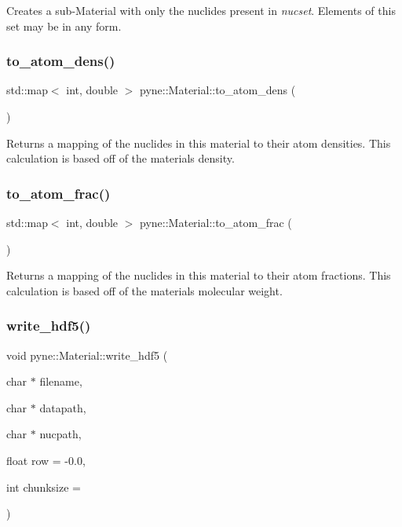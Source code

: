 Creates a sub-\/\+Material with only the nuclides present in {\itshape nucset}. Elements of this set may be in any form. \mbox{\label{classpyne_1_1_material_adfc05d7c09a0908047a9b733aa7c78b1}} 
\subsubsection{\texorpdfstring{to\+\_\+atom\+\_\+dens()}{to\_atom\_dens()}}
{\footnotesize\ttfamily std\+::map$<$ int, double $>$ pyne\+::\+Material\+::to\+\_\+atom\+\_\+dens (\begin{DoxyParamCaption}{ }\end{DoxyParamCaption})}

Returns a mapping of the nuclides in this material to their atom densities. This calculation is based off of the material\textquotesingle{}s density. \mbox{\label{classpyne_1_1_material_a89a5ef5a4bfca961981a46a4252299fd}} 
\subsubsection{\texorpdfstring{to\+\_\+atom\+\_\+frac()}{to\_atom\_frac()}}
{\footnotesize\ttfamily std\+::map$<$ int, double $>$ pyne\+::\+Material\+::to\+\_\+atom\+\_\+frac (\begin{DoxyParamCaption}{ }\end{DoxyParamCaption})}

Returns a mapping of the nuclides in this material to their atom fractions. This calculation is based off of the material\textquotesingle{}s molecular weight. \mbox{\label{classpyne_1_1_material_adf226509fcdbf44476019fde3ff2f6ee}} 
\subsubsection{\texorpdfstring{write\+\_\+hdf5()}{write\_hdf5()}\hspace{0.1cm}{\footnotesize\ttfamily [1/2]}}
{\footnotesize\ttfamily void pyne\+::\+Material\+::write\+\_\+hdf5 (\begin{DoxyParamCaption}\item[{char $\ast$}]{filename,  }\item[{char $\ast$}]{datapath,  }\item[{char $\ast$}]{nucpath,  }\item[{float}]{row = {\ttfamily -\/0.0},  }\item[{int}]{chunksize = {} }\end{DoxyParamCaption})}


